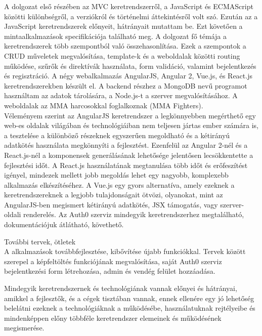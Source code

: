 
A dolgozat első részében az MVC keretrendszerről, a JavaScript és ECMAScript közötti különbségről, a verziókról és történelmi áttekintésről volt szó. Ezután az a JavaScript keretrendszerek előnyeit, hátrányait mutattam be. Ezt követően a mintaalkalmazások specifikációja található meg.
A dolgozat fő témája a keretrendszerek több szempontból való összehasonlítása. Ezek a szempontok a CRUD műveletek megvalósítása, template-k és a weboldalak közötti routing működése, szűrők és direktívák használata, form validáció, valamint bejelentkezés és regisztráció. 
A négy webalkalmazás AngularJS, Angular 2, Vue.js, és React.js keretrendszerekben készült el. A backend részhez a MongoDB nevű programot használtam az adatok tárolására, a Node.js-t a szerver megvalósításához. A weboldalak az MMA harcosokkal foglalkoznak (MMA Fighters).
\\Véleményem szerint az AngularJS keretrendszer a legkönnyebben megérthető egy web-es oldalak világában és technológiáiban nem teljesen jártas ember számára is, a tesztelése a különböző részeknek egyszerűen megoldható és a kétirányú adatkötés használata megkönnyíti a fejlesztést. Ezenfelül az Angular 2-nél és a React.js-nél a komponensek generálásának lehetősége jelentősen lecsökkentette a fejlesztési időt. A React.js használatának megtanulása több időt és erőfeszítést igényel, mindezek mellett jobb megoldás lehet egy nagyobb, komplexebb alkalmazás elkészítéséhez. A Vue.js egy gyors alternatíva, amely ezeknek a keretrendszereknek a legjobb tulajdonságait ötvözi, olyanokat, mint az AngularJS-ben megismert kétirányú adatkötés, JSX támogatás, vagy szerver-oldali renderelés.
Az Auth0 szerviz mindegyik keretrendszerhez megtalálható, dokumentációjuk átlátható, követhető. 

További tervek, ötletek \\
A alkalmazások továbbfejlesztése, kibővítése újabb funkciókkal. Tervek között szerepel a képfeltöltés funkciójának megvalósítása, saját Auth0 szerviz bejelentkezési form létrehozása, admin és vendég felület hozzáadása.

Mindegyik keretrendszernek és technológiának vannak előnyei és hátrányai, amikkel a fejlesztők, és a cégek tisztában vannak, ennek ellenére egy jó lehetőség belelátni ezeknek a technológiáknak a működésébe, használatuknak rejtélyeibe és mindenképpen előny többféle keretrendszer elemeinek és működésének megismerése.

